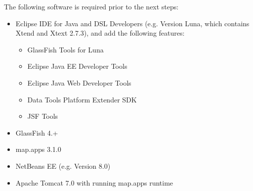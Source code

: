 


The following software is required prior to the next steps:

\begin{itemize}
\item Eclipse IDE for Java and DSL Developers (e.g. Version Luna, which contains Xtend and Xtext 2.7.3), and add the following features:
\begin{itemize}
\item GlassFish Tools for Luna
\item Eclipse Java EE Developer Tools
\item Eclipse Java Web Developer Tools
\item Data Tools Platform Extender SDK
\item JSF Tools
\end{itemize}
\item GlassFish 4.+
\item map.apps 3.1.0
\item NetBeans EE (e.g. Version 8.0)
\item Apache Tomcat 7.0 with running map.apps runtime 
\end{itemize}






